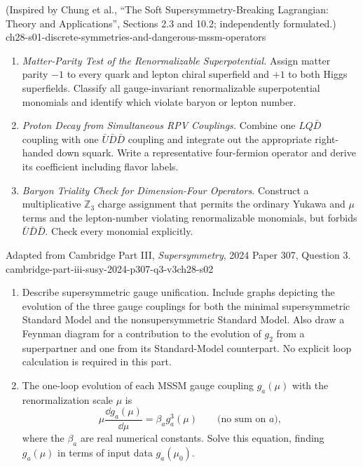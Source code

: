 
\begin{enumerate}
    {(Inspired by Chung et al., ``The Soft Supersymmetry-Breaking Lagrangian: Theory and Applications'', Sections 2.3 and 10.2; independently formulated.)}
    {ch28-s01-discrete-symmetries-and-dangerous-mssm-operators}
  \begin{enumerate}
    \item \emph{Matter-Parity Test of the Renormalizable Superpotential.}
    Assign matter parity \(-1\) to every quark and lepton chiral superfield
      and \(+1\) to both Higgs superfields.  Classify all gauge-invariant
      renormalizable superpotential monomials and identify which violate
      baryon or lepton number.
    \item \emph{Proton Decay from Simultaneous RPV Couplings.}
    Combine one \(LQ\bar D\) coupling with one
      \(\bar U\bar D\bar D\) coupling and integrate out the appropriate
      right-handed down squark.  Write a representative four-fermion operator
      and derive its coefficient including flavor labels.
    \item \emph{Baryon Triality Check for Dimension-Four Operators.}
    Construct a multiplicative \(\mathbb Z_3\) charge assignment that
      permits the ordinary Yukawa and \(\mu\) terms and the lepton-number
      violating renormalizable monomials, but forbids
      \(\bar U\bar D\bar D\).  Check every monomial explicitly.
  \end{enumerate}

    {Adapted from Cambridge Part III, \emph{Supersymmetry}, 2024
    Paper 307, Question 3.}
    {cambridge-part-iii-susy-2024-p307-q3-v3ch28-s02}
  \begin{enumerate}
    \item[(a)]
    Describe supersymmetric gauge unification.  Include graphs depicting the
    evolution of the three gauge couplings for both the minimal
    supersymmetric Standard Model and the nonsupersymmetric Standard Model.
    Also draw a Feynman diagram for a contribution to the evolution of
    \(g_2\) from a superpartner and one from its Standard-Model counterpart.
    No explicit loop calculation is required in this part.

    \item[(b)]
    The one-loop evolution of each MSSM gauge coupling \(g_a(\mu)\) with the
    renormalization scale \(\mu\) is
    \[
      \mu\frac{\dd g_a(\mu)}{\dd\mu}
        =\beta_a g_a^3(\mu)
      \qquad\text{(no sum on \(a\))},
      \tag{28.2.1}
    \]
    where the \(\beta_a\) are real numerical constants.  Solve this equation,
    finding \(g_a(\mu)\) in terms of input data \(g_a(\mu_0)\).


\end{enumerate}
\end{enumerate}
